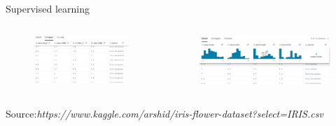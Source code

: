 \begin{frame}{Supervised learning}
	\begin{columns}
		\begin{column}{.5\textwidth}
			\begin{figure}
				\includegraphics[width=1\textwidth, center]{figures/iris_dataset_1}
				
			\end{figure}
		\end{column}
		\begin{column}{.5\textwidth}
			\begin{figure}
				\includegraphics[width=1\textwidth, center]{figures/iris_dataset_2}
			
			\end{figure}
		\end{column}
	\end{columns}
	\begin{center}
		{\tiny Source:{\em https://www.kaggle.com/arshid/iris-flower-dataset?select=IRIS.csv}}
	\end{center}
\end{frame}

